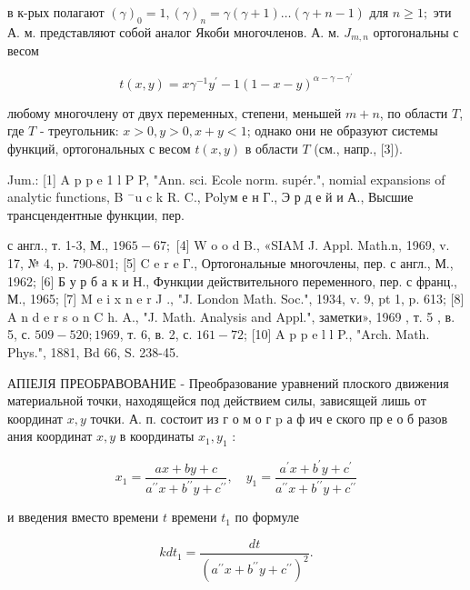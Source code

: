\documentclass[10pt]{article}
\begin{document}
в к-рых полагают $(\gamma)_{0}=1,(\gamma)_{n}=\gamma(\gamma+1) \ldots(\gamma+n-1)$ для $n \geqslant 1 ;$ эти А. м. представляют собой аналог Якоби многочленов. А. м. $J_{m, n}$ ортогональны с весом



\[

t(x, y)=x \gamma^{-1} y^{\prime}-1(1-x-y)^{\alpha-\gamma-\gamma^{\prime}}

\]



любому многочлену от двух переменных, степени, меньшей $m+n$, по области $T$, где $T$ - треугольник: $x>0, y>0, x+y<1$; однако они не образуют системы функций, ортогональных с весом $t(x, y)$ в области $T$ (см., напр., [3]).



Jum.: [1] A p p e 1 l P P, "Ann. sci. Ecole norm. supér.", nomial expansions of analytic functions, B $^{-}$u c k R. C., Polyм е н Г., Э р д е й и А., Высшие трансцендентные функции, пер.

с англ., т. 1-3, М., $1965-67 ;$ [4] W o o d B., «SIAM J. Appl. Math.n, 1969, v. 17, № 4, p. 790-801; [5] C e r e Г., Ортогональные многочлены, пер. с англ., М., 1962; [6] Б у р б а к и Н., Функции действительного переменного, пер. с франц., М., 1965; [7] M e i x n e r J ., "J. London Math. Soc.", 1934, v. 9, pt 1, p. 613; [8] A n d e r s o n C h. A., "J. Math. Analysis and Appl.", заметки», 1969 , т. 5 , в. 5, с. $509-520 ; 1969$, т. 6, в. 2, с. $161-72$; [10] A p p e l l P., "Arch. Math. Phys.", 1881, Bd 66, S. 238-45.



АПIЕЈIЯ ПРЕОБРАВОВАНИЕ - Преобразование уравнений плоского движения материальной точки, находящейся под действием силы, зависящей лишь от координат $x, y$ точки. А. п. состоит из г о м о г p а ф ич е ского пр е о б разов ания координат $x, y$ в координаты $x_{1}, y_{1}$ :



\[

x_{1}=\frac{a x+b y+c}{a^{\prime \prime} x+b^{\prime \prime} y+c^{\prime \prime}}, \quad y_{1}=\frac{a^{\prime} x+b^{\prime} y+c^{\prime}}{a^{\prime \prime} x+b^{\prime \prime} y+c^{\prime \prime}}

\]



и введения вместо времени $t$ времени $t_{1}$ по формуле



\[

k d t_{1}=\frac{d t}{\left(a^{\prime \prime} x+b^{\prime \prime} y+c^{\prime \prime}\right)^{2}} .

\]
\end{document}
